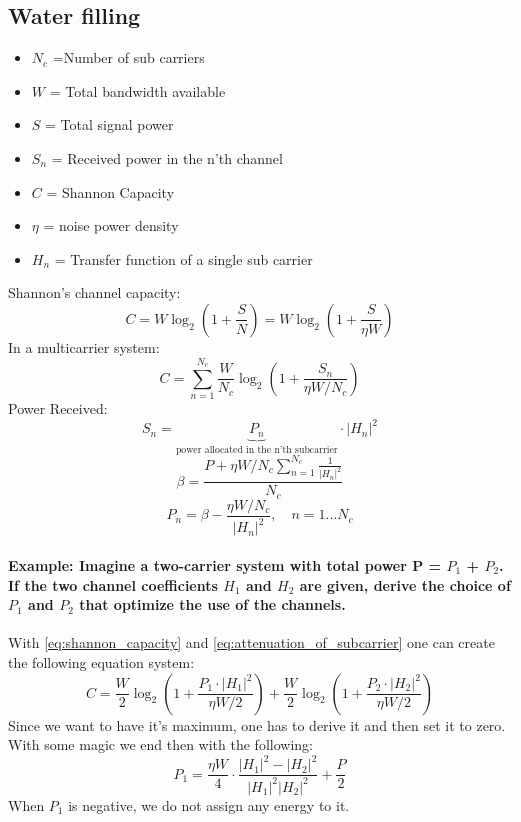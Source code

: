 \subsection{Water filling}
\begin{itemize}
    \item $N_c$ =Number of sub carriers
    \item $W$ = Total bandwidth available
    \item $S$ = Total signal power
    \item $S_n$ = Received power in the n'th channel
    \item $C$ = Shannon Capacity
    \item $\eta$ = noise power density
    \item $H_n$ = Transfer function of a single sub carrier
\end{itemize}
Shannon's channel capacity:
\begin{equation}\label{eq:shannon_capacity}
C=W \log _2\left(1+\frac{S}{N}\right)=W \log _2\left(1+\frac{S}{\eta W}\right)
\end{equation}
In a multicarrier system:
$$
C=\sum_{n=1}^{N_c} \frac{W}{N_c} \log _2\left(1+\frac{S_n}{\eta W / N_c}\right)
$$
Power Received:
\begin{equation}\label{eq:attenuation_of_subcarrier}
S_n=\underbrace{P_n}_{\text{power allocated in the n'th subcarrier}} \cdot\left|H_n\right|^2
\end{equation}
\begin{equation}\label{eq:waterfilling_beta}
\beta=\frac{P+\eta W / N_c \sum_{n=1}^{N_c} \frac{1}{\left|H_n\right|^2}}{N_c}
\end{equation}
\begin{equation}\label{eq:waterfilling_beta2}
P_n=\beta-\frac{\eta W / N_c}{\left|H_n\right|^2}, \quad n=1 \ldots N_c
\end{equation}
\paragraph{Example: Imagine a two-carrier system with total power P = $P_1$ + $P_2$. If the two channel coefficients $H_1$ and $H_2$ are given, derive the choice of $P_1$ and $P_2$ that optimize the use of the channels.}
With \autoref{eq:shannon_capacity} and \autoref{eq:attenuation_of_subcarrier} one can create the following equation system:
$$
C=\frac{W}{2} \log _2\left(1+\frac{P_1 \cdot\left|H_1\right|^2}{\eta W / 2}\right)+\frac{W}{2} \log _2\left(1+\frac{P_2 \cdot\left|H_2\right|^2}{\eta W / 2}\right)
$$
Since we want to have it's maximum, one has to derive it and then set it to zero.\newline
With some magic we end then with the following:
$$
P_1=\frac{\eta W}{4} \cdot \frac{\left|H_1\right|^2-\left|H_2\right|^2}{\left|H_1\right|^2\left|H_2\right|^2}+\frac{P}{2}
$$
When $P_1$ is negative, we do not assign any energy to it.
